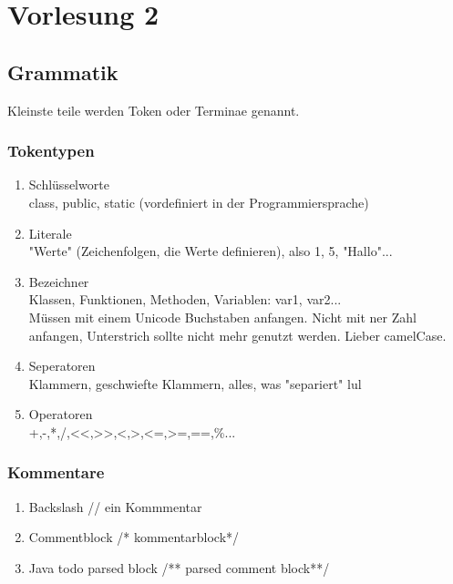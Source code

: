 \documentclass[11pt, a4paper]{article}
\begin{document}
\section{Vorlesung 2}
\subsection{Grammatik}
Kleinste teile werden Token oder Terminae genannt.
\subsubsection{Tokentypen}
\begin{enumerate}
\item Schlüsselworte\\class, public, static (vordefiniert in der Programmiersprache)
\item Literale\\"Werte" (Zeichenfolgen, die Werte definieren), also 1, 5, "Hallo"...
\item Bezeichner\\Klassen, Funktionen, Methoden, Variablen: var1, var2...\\Müssen mit einem Unicode Buchstaben anfangen. Nicht mit ner Zahl anfangen, Unterstrich sollte nicht mehr genutzt werden. Lieber camelCase.
\item Seperatoren\\Klammern, geschwiefte Klammern, alles, was "separiert" lul
\item Operatoren\\+,-,*,/,<<,>>,<,>,<=,>=,==,\%...
\end{enumerate}

\subsubsection{Kommentare}
\begin{enumerate}
\item Backslash // ein Kommmentar
\item Commentblock /* kommentarblock*/
\item Java todo parsed block /** parsed comment block**/
\end{enumerate}
\end{document}

